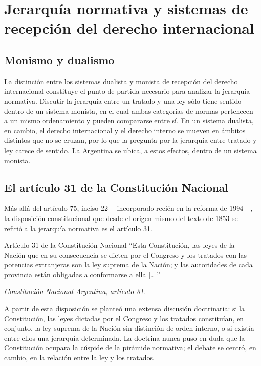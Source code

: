 \documentclass[12pt,oneside]{book}
\begin{document}
\section{Jerarquía normativa y sistemas de recepción del derecho internacional}

\subsection{Monismo y dualismo}

La distinción entre los sistemas dualista y monista de recepción del derecho internacional constituye el punto de partida necesario para analizar la jerarquía normativa. Discutir la jerarquía entre un tratado y una ley sólo tiene sentido dentro de un sistema monista, en el cual ambas categorías de normas pertenecen a un mismo ordenamiento y pueden compararse entre sí. En un sistema dualista, en cambio, el derecho internacional y el derecho interno se mueven en ámbitos distintos que no se cruzan, por lo que la pregunta por la jerarquía entre tratado y ley carece de sentido. La Argentina se ubica, a estos efectos, dentro de un sistema monista.

\subsection{El artículo 31 de la Constitución Nacional}

Más allá del artículo 75, inciso 22 —incorporado recién en la reforma de 1994—, la disposición constitucional que desde el origen mismo del texto de 1853 se refirió a la jerarquía normativa es el artículo 31.

\begin{definition}{Artículo 31 de la Constitución Nacional}
``Esta Constitución, las leyes de la Nación que en su consecuencia se dicten por el Congreso y los tratados con las potencias extranjeras son la ley suprema de la Nación; y las autoridades de cada provincia están obligadas a conformarse a ella [\ldots]''

\textit{Constitución Nacional Argentina, artículo 31.}
\end{definition}

A partir de esta disposición se planteó una extensa discusión doctrinaria: si la Constitución, las leyes dictadas por el Congreso y los tratados constituían, en conjunto, la ley suprema de la Nación sin distinción de orden interno, o si existía entre ellos una jerarquía determinada. La doctrina nunca puso en duda que la Constitución ocupara la cúspide de la pirámide normativa; el debate se centró, en cambio, en la relación entre la ley y los tratados.
\end{document}
